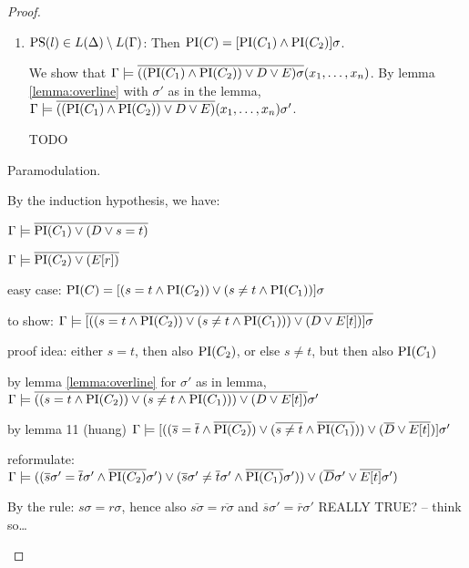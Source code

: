 \begin{proof}
\begin{description}
\begin{enumerate}
				\item $\mathrm{PS}(l) \in L(\Delta) \setminus L(\Gamma)$:
					Then $\mathrm{PI}(C) = [\mathrm{PI}(C_1) \land \mathrm{PI}(C_2)]\sigma$. 

					We show that $\Gamma \models \overline{((\mathrm{PI}(C_1) \land \mathrm{PI}(C_2)) \lor D \lor E)\sigma}(x_1, \ldots, x_n) $.
					By lemma \ref{lemma:overline} with $\sigma'$ as in the lemma,
					$\Gamma \models \overline{((\mathrm{PI}(C_1) \land \mathrm{PI}(C_2)) \lor D \lor E)}(x_1, \ldots, x_n) \sigma'$.

					TODO


			\end{enumerate}

		\item{Paramodulation.}

			\begin{prooftree}
			\end{prooftree}

			By the induction hypothesis, we have:

			$\Gamma \models \overline{\mathrm{PI}(C_1) \lor (D\lor s=t)}$

			$\Gamma \models \overline{\mathrm{PI}(C_2) \lor (E[r])}$



	easy case:
			$\mathrm{PI}(C) = [ ( s=t \land \mathrm{PI}(C_2) ) \lor (s\neq t \land \mathrm{PI}(C_1)) ]\sigma$

			to show:
			$\Gamma \models \overline{ [ (( s=t \land \mathrm{PI}(C_2) ) \lor (s\neq t \land \mathrm{PI}(C_1))) \lor (D \lor E[t]) ]\sigma} $

			proof idea: either $s=t$, then also $\mathrm{PI}(C_2)$, or else $s\neq t$, but then also $\mathrm{PI}(C_1)$

			by lemma \ref{lemma:overline} for $\sigma'$ as in lemma, 
			$\Gamma \models \overline{ (( s=t \land \mathrm{PI}(C_2) ) \lor (s\neq t \land \mathrm{PI}(C_1))) \lor (D \lor E[t]) }\sigma' $

			by lemma 11 (huang)
			$\Gamma \models [((\overline{s}=\overline{t} \land \overline{\mathrm{PI}(C_2)} ) \lor (\overline{s\neq t} \land \overline{\mathrm{PI}(C_1)})) \lor (\overline{D} \lor \overline{E[t]}) ]\sigma' $

			reformulate:
			$\Gamma \models ((\overline{s}\sigma'=\overline{t}\sigma' \land \overline{\mathrm{PI}(C_2)}\sigma' ) \lor (\overline{s}\sigma'\neq \overline{t}\sigma' \land \overline{\mathrm{PI}(C_1)}\sigma')) \lor (\overline{D}\sigma' \lor \overline{E[t]}\sigma') $

			By the rule: $s\sigma = r\sigma$, hence also $\overline{s\sigma} = \overline{r\sigma}$ and $\overline{s}\sigma' = \overline{r}\sigma'$ REALLY TRUE? -- think so\dots


\end{description}
\end{proof}
